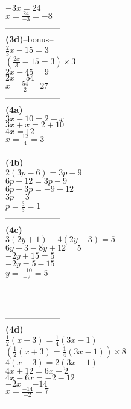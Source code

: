 \documentclass[11pt,a4paper]{article}
\begin{document}
\begin{flushleft}
\begin{minipage}{6cm}
$-3x=24$\\
$x=\frac{24}{-3}=-8$\\
{\color{blue} --------------------}\\
{\bf (3d)}--bonus--\\
$\frac{2}{3}x-15=3$\\
$(\frac{2x}{3}-15=3)\times 3$\\
$2x-45=9$\\
$2x=54$\\
$x=\frac{54}{2}=27$\\
{\color{blue} --------------------}\\
{\bf (4a)}\\
$3x-10=2-x$\\
$3x+x=2+10$\\
$4x=12$\\
$x=\frac{12}{4}=3$\\
{\color{blue} --------------------}\\
{\bf (4b)}\\
$2(3p-6)=3p-9$\\
$6p-12=3p-9$\\
$6p-3p=-9+12$\\
$3p=3$\\
$p=\frac{3}{3}=1$\\
{\color{blue} --------------------}\\
{\bf (4c)}\\
$3(2y+1)-4(2y-3)=5$\\
$6y+3-8y+12=5$\\
$-2y+15=5$\\
$-2y=5-15$\\
$y=\frac{-10}{-2}=5$\\
\\
\\
\end{minipage}
\begin{minipage}{6cm}
{\color{blue} --------------------}\\
{\bf (4d)}\\
$\frac{1}{2}(x+3)=\frac{1}{4}(3x-1)$\\
$\left( \frac{1}{2}(x+3)=\frac{1}{4}(3x-1)\right)\times 8$\\
$4(x+3)=2(3x-1)$\\
$4x+12=6x-2$\\
$4x-6x=-2-12$\\
$-2x=-14$\\
$x=\frac{-14}{-2}=7$\\
{\color{blue} --------------------}\\

\end{minipage}
\end{flushleft}
\end{document}
